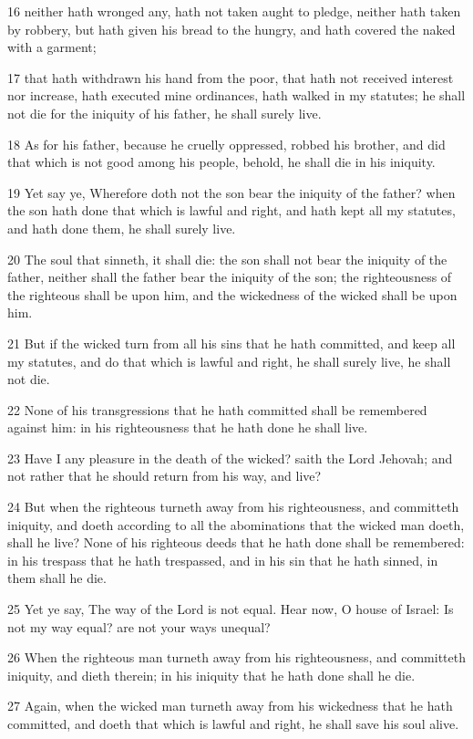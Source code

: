 \par 16 neither hath wronged any, hath not taken aught to pledge, neither hath taken by robbery, but hath given his bread to the hungry, and hath covered the naked with a garment;
\par 17 that hath withdrawn his hand from the poor, that hath not received interest nor increase, hath executed mine ordinances, hath walked in my statutes; he shall not die for the iniquity of his father, he shall surely live.
\par 18 As for his father, because he cruelly oppressed, robbed his brother, and did that which is not good among his people, behold, he shall die in his iniquity.
\par 19 Yet say ye, Wherefore doth not the son bear the iniquity of the father? when the son hath done that which is lawful and right, and hath kept all my statutes, and hath done them, he shall surely live.
\par 20 The soul that sinneth, it shall die: the son shall not bear the iniquity of the father, neither shall the father bear the iniquity of the son; the righteousness of the righteous shall be upon him, and the wickedness of the wicked shall be upon him.
\par 21 But if the wicked turn from all his sins that he hath committed, and keep all my statutes, and do that which is lawful and right, he shall surely live, he shall not die.
\par 22 None of his transgressions that he hath committed shall be remembered against him: in his righteousness that he hath done he shall live.
\par 23 Have I any pleasure in the death of the wicked? saith the Lord Jehovah; and not rather that he should return from his way, and live?
\par 24 But when the righteous turneth away from his righteousness, and committeth iniquity, and doeth according to all the abominations that the wicked man doeth, shall he live? None of his righteous deeds that he hath done shall be remembered: in his trespass that he hath trespassed, and in his sin that he hath sinned, in them shall he die.
\par 25 Yet ye say, The way of the Lord is not equal. Hear now, O house of Israel: Is not my way equal? are not your ways unequal?
\par 26 When the righteous man turneth away from his righteousness, and committeth iniquity, and dieth therein; in his iniquity that he hath done shall he die.
\par 27 Again, when the wicked man turneth away from his wickedness that he hath committed, and doeth that which is lawful and right, he shall save his soul alive.
